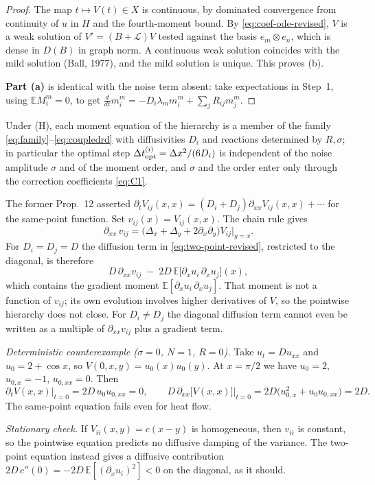 \begin{proof}
The map $t\mapsto V(t)\in X$ is continuous, by dominated convergence from continuity of $u$ in $H$ and the fourth-moment bound. By \eqref{eq:coef-ode-revised}, $V$ is a weak solution of $V'=(B+\mathcal L)V$ tested against the basis $e_m\otimes e_n$, which is dense in $D(B)$ in graph norm. A continuous weak solution coincides with the mild solution (Ball, 1977), and the mild solution is unique. This proves (b).
 
\textbf{Part (a)} is identical with the noise term absent: take expectations in Step~1, using $\mathbb{E}M_i^m=0$, to get $\frac{d}{dt}m_i^m=-D_i\lambda_m m_i^m+\sum_jR_{ij}m_j^m$.
\end{proof}

\begin{corollary}\label{cor:indep}
Under (H), each moment equation of the hierarchy is a member of the family \eqref{eq:family}--\eqref{eq:coupledrd} with diffusivities $D_i$ and reactions determined by $R,\sigma$; in particular the optimal step $\Delta t_{\mathrm{opt}}^{(i)}=\Delta x^2/(6D_i)$ is independent of the noise amplitude $\sigma$ and of the moment order, and $\sigma$ and the order enter only through the correction coefficients \eqref{eq:C1}.
\end{corollary}
 
\begin{remark}\label{rem:pointwise-fails}
The former Prop.~12 asserted $\partial_t V_{ij}(x,x)=(D_i+D_j)\partial_{xx}V_{ij}(x,x)+\cdots$ for the same-point function. Set $v_{ij}(x)=V_{ij}(x,x)$. The chain rule gives
\[
\partial_{xx}\,v_{ij}=\big(\Delta_x+\Delta_y+2\partial_x\partial_y\big)V_{ij}\Big|_{y=x}.
\]
For $D_i=D_j=D$ the diffusion term in \eqref{eq:two-point-revised}, restricted to the diagonal, is therefore
\[
D\,\partial_{xx}v_{ij}\;-\;2D\,\mathbb{E}\big[\partial_xu_i\,\partial_xu_j\big](x),
\]
which contains the gradient moment $\mathbb{E}[\partial_xu_i\,\partial_xu_j]$. That moment is not a function of $v_{ij}$; its own evolution involves higher derivatives of $V$, so the pointwise hierarchy does not close. For $D_i\ne D_j$ the diagonal diffusion term cannot even be written as a multiple of $\partial_{xx}v_{ij}$ plus a gradient term.
 
\emph{Deterministic counterexample ($\sigma=0$, $N=1$, $R=0$).} Take $u_t=Du_{xx}$ and $u_0=2+\cos x$, so $V(0,x,y)=u_0(x)u_0(y)$. At $x=\pi/2$ we have $u_0=2$, $u_{0,x}=-1$, $u_{0,xx}=0$. Then
\[
\partial_t V(x,x)\big|_{t=0}=2D\,u_0u_{0,xx}=0,
\qquad
D\,\partial_{xx}\big[V(x,x)\big]\big|_{t=0}=2D\big(u_{0,x}^2+u_0u_{0,xx}\big)=2D .
\]
The same-point equation fails even for heat flow.
 
\emph{Stationary check.} If $V_{ii}(x,y)=c(x-y)$ is homogeneous, then $v_{ii}$ is constant, so the pointwise equation predicts no diffusive damping of the variance. The two-point equation instead gives a diffusive contribution $2D\,c''(0)=-2D\,\mathbb{E}[(\partial_xu_i)^2]<0$ on the diagonal, as it should.
\end{remark}
 
